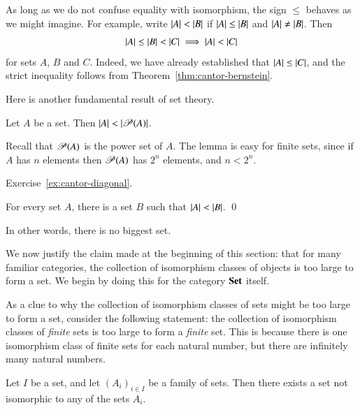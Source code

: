 As long as we do not confuse equality with isomorphism, the sign $\leq$
behaves as we might imagine.  For example, write $\left|A\right| < \left|B\right|$ if
$\left|A\right| \leq \left|B\right|$ and $\left|A\right| \neq \left|B\right|$.  Then
%
\begin{equation}
\label{eq:bernstein-impl}
\left|A\right| \leq \left|B\right| < \left|C\right| \implies \left|A\right| < \left|C\right|
\end{equation}
%
for sets $A$, $B$ and $C$.  Indeed, we have already established that
$\left|A\right| \leq \left|C\right|$, and the strict inequality follows from
Theorem~\ref{thm:cantor-bernstein}.

Here is another fundamental result of set theory.

\begin{thm}[Cantor]
\label{thm:cantor}
%
%
Let $A$ be a set.  Then $\left|A\right| < \left|\operatorname{\mathscr{P}}(A)\right|$.
\end{thm}
%
Recall that $\operatorname{\mathscr{P}}(A)$ is the power set of $A$.  The lemma is easy for finite
sets, since if $A$ has $n$ elements then $\operatorname{\mathscr{P}}(A)$ has $2^n$ elements, and
$n < 2^n$.

\begin{pf}
Exercise~\ref{ex:cantor-diagonal}.
\end{pf}

\begin{cor}
\label{cor:no-biggest-set}
For every set $A$, there is a set $B$ such that $\left|A\right| < \left|B\right|$.
\qed
\end{cor}

In other words, there is no biggest set.

We now justify the claim made at the beginning of this section: that for
many familiar categories, the collection of isomorphism classes of objects
is too large to form a set.  We begin by doing this for the category $\mathbf{Set}$
itself.

As a clue to why the collection of isomorphism classes of sets might be too
large to form a set, consider the following statement: the collection of
isomorphism classes of \emph{finite} sets is too large to form a
\emph{finite} set.  This is because there is one isomorphism class of
finite sets for each natural number, but there are infinitely many natural
numbers.

\begin{propn}
\label{propn:iso-classes-of-sets}
Let $I$ be a set, and let $(A_i)_{i \in I}$ be a family of sets.  Then there
exists a set not isomorphic to any of the sets $A_i$.
\end{propn}

